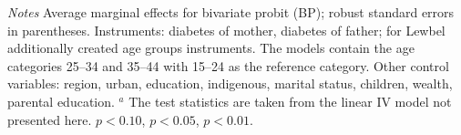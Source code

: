 \begin{table}[p]
\begin{center}
\begin{adjustbox}{max width=\textwidth, center}
\begin{threeparttable}
{\begin{tabular}{l*{4}{S S}}
 \end{tabular}
\begin{tablenotes}
\item \footnotesize \textit{Notes}  Average marginal effects for bivariate probit (BP); robust standard errors in parentheses. Instruments: diabetes of mother, diabetes of father; for Lewbel additionally created age groups instruments. The models contain the age categories 25--34 and 35--44 with 15--24 as the reference category. Other control variables: region, urban, education, indigenous, marital status, children, wealth, parental education. $^a$ The test statistics are taken from the linear IV model not presented here.
\sym{*} \(p<0.10\), \sym{**} \(p<0.05\), \sym{***} \(p<0.01\).
\end{tablenotes}
}
\end{threeparttable} 
\end{adjustbox}
\end{center}
\end{table}


\clearpage


